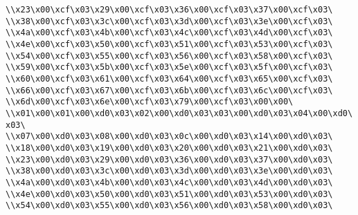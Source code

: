 \verb|\\x23\x00\xcf\x03\x29\x00\xcf\x03\x36\x00\xcf\x03\x37\x00\xcf\x03\|\newline
\verb|\\x38\x00\xcf\x03\x3c\x00\xcf\x03\x3d\x00\xcf\x03\x3e\x00\xcf\x03\|\newline
\verb|\\x4a\x00\xcf\x03\x4b\x00\xcf\x03\x4c\x00\xcf\x03\x4d\x00\xcf\x03\|\newline
\verb|\\x4e\x00\xcf\x03\x50\x00\xcf\x03\x51\x00\xcf\x03\x53\x00\xcf\x03\|\newline
\verb|\\x54\x00\xcf\x03\x55\x00\xcf\x03\x56\x00\xcf\x03\x58\x00\xcf\x03\|\newline
\verb|\\x59\x00\xcf\x03\x5b\x00\xcf\x03\x5e\x00\xcf\x03\x5f\x00\xcf\x03\|\newline
\verb|\\x60\x00\xcf\x03\x61\x00\xcf\x03\x64\x00\xcf\x03\x65\x00\xcf\x03\|\newline
\verb|\\x66\x00\xcf\x03\x67\x00\xcf\x03\x6b\x00\xcf\x03\x6c\x00\xcf\x03\|\newline
\verb|\\x6d\x00\xcf\x03\x6e\x00\xcf\x03\x79\x00\xcf\x03\x00\x00\|\newline
\verb|\\x01\x00\x01\x00\xd0\x03\x02\x00\xd0\x03\x03\x00\xd0\x03\x04\x00\xd0\x03\|\newline
\verb|\\x07\x00\xd0\x03\x08\x00\xd0\x03\x0c\x00\xd0\x03\x14\x00\xd0\x03\|\newline
\verb|\\x18\x00\xd0\x03\x19\x00\xd0\x03\x20\x00\xd0\x03\x21\x00\xd0\x03\|\newline
\verb|\\x23\x00\xd0\x03\x29\x00\xd0\x03\x36\x00\xd0\x03\x37\x00\xd0\x03\|\newline
\verb|\\x38\x00\xd0\x03\x3c\x00\xd0\x03\x3d\x00\xd0\x03\x3e\x00\xd0\x03\|\newline
\verb|\\x4a\x00\xd0\x03\x4b\x00\xd0\x03\x4c\x00\xd0\x03\x4d\x00\xd0\x03\|\newline
\verb|\\x4e\x00\xd0\x03\x50\x00\xd0\x03\x51\x00\xd0\x03\x53\x00\xd0\x03\|\newline
\verb|\\x54\x00\xd0\x03\x55\x00\xd0\x03\x56\x00\xd0\x03\x58\x00\xd0\x03\|\newline
